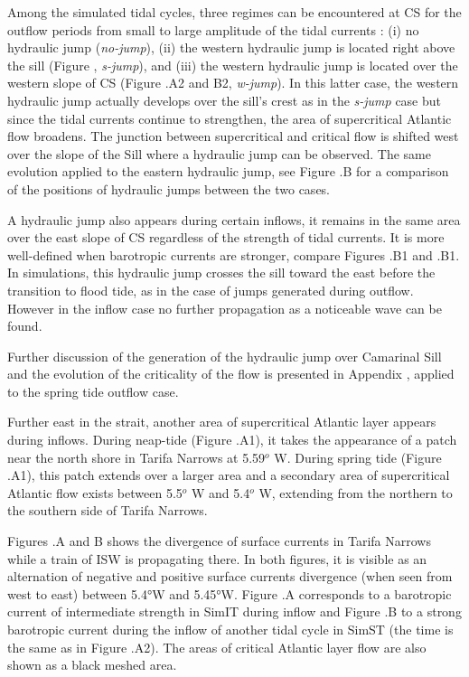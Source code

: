 Among the simulated tidal cycles, three regimes can be encountered at CS for the outflow periods from small to large amplitude of the tidal currents : (i) no hydraulic jump (\textit{no-jump}), (ii) the western hydraulic jump is located right above the sill (Figure , \textit{s-jump}), and (iii) the western hydraulic jump is located over the western slope of CS (Figure .A2 and B2, \textit{w-jump}). In this latter case, the western hydraulic jump actually develops over the sill's crest as in the \textit{s-jump} case but since the tidal currents continue to strengthen, the area of supercritical Atlantic flow broadens. The junction between supercritical and critical flow is shifted west over the slope of the Sill where a hydraulic jump can be observed. The same evolution applied to the eastern hydraulic jump, see Figure .B for a comparison of the positions of hydraulic jumps between the two cases. 

A hydraulic jump also appears during certain inflows, it remains in the same area over the east slope of CS regardless of the strength of tidal currents. It is more well-defined when barotropic currents are stronger, compare Figures .B1 and .B1. In simulations, this hydraulic jump crosses the sill toward the east before the transition to flood tide, as in the case of jumps generated during outflow. However in the inflow case no further propagation as a noticeable wave can be found.

Further discussion of the generation of the hydraulic jump over Camarinal Sill and the evolution of the criticality of the flow is presented in Appendix , applied to the spring tide outflow case.

Further east in the strait, another area of supercritical Atlantic layer appears during inflows. During neap-tide (Figure .A1), it takes the appearance of a patch near the north shore in Tarifa Narrows at 5.59$^o$ W. During spring tide (Figure .A1), this patch extends over a larger area and a secondary area of supercritical Atlantic flow exists between 5.5$^o$ W and 5.4$^o$ W, extending from the northern to the southern side of Tarifa Narrows. 

Figures .A and B shows the divergence of surface currents in Tarifa Narrows while a train of ISW is propagating there. In both figures, it is visible as an alternation of negative and positive surface currents divergence (when seen from west to east) between 5.4°W and 5.45°W. Figure .A corresponds to a barotropic current of intermediate strength in SimIT during inflow and Figure .B to a strong barotropic current during the inflow of another tidal cycle in SimST (the time is the same as in Figure .A2). The areas of critical Atlantic layer flow are also shown as a black meshed area. 

